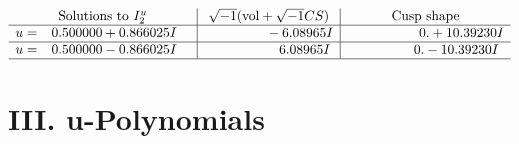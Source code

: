 \documentclass[1p]{elsarticle_modified}
\theoremstyle{definition}
\newcommand{\I}{\sqrt{-1}}
\begin{document}
$$\begin{array}{c|c|c}  
\text{Solutions to }I^u_{2}& \I (\text{vol} + \sqrt{-1}CS) & \text{Cusp shape}\\
 \hline 
\begin{aligned}
u &= \phantom{-}0.500000 + 0.866025 I\end{aligned}
 & \phantom{-0.000000 } -6.08965 I & \phantom{-0.000000 -}0. + 10.39230 I \\ \hline\begin{aligned}
u &= \phantom{-}0.500000 - 0.866025 I\end{aligned}
 & \phantom{-0.000000 -}6.08965 I & \phantom{-0.000000 } 0. - 10.39230 I\\
 \hline 
 \end{array}$$\newpage
\newpage\renewcommand{\arraystretch}{1}
\centering \section*{ III. u-Polynomials}
\end{document}
